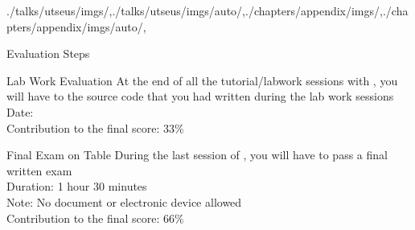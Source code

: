 \begin{graphicspathcontext}{{./talks/utseus/imgs/},{./talks/utseus/imgs/auto/},{./chapters/appendix/imgs/},{./chapters/appendix/imgs/auto/},\old}

\begin{frame}{Evaluation Steps}
	\begin{block}{Lab Work Evaluation}
		At the end of all the tutorial/labwork sessions with , you will have to  the source code that you had written during the lab work sessions \\
		Date:  \\
		Contribution to the final score: 33\%
	\end{block}
	\begin{block}{Final Exam on Table}
		During the last session of , you will have to pass a final written exam \\
		Duration: 1 hour 30 minutes \\
		Note: No document or electronic device allowed \\
		Contribution to the final score: 66\%
	\end{block}
\end{frame}




\end{graphicspathcontext}

\endinput

